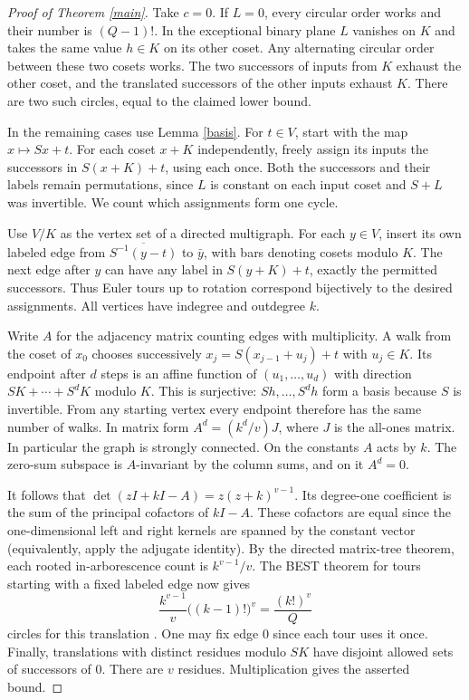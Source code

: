 \documentclass[11pt]{article}
\begin{document}
\begin{proof}[Proof of Theorem \ref{main}]
Take $c=0$. If $L=0$, every circular order works and their number is $(Q-1)!$. In the exceptional binary plane $L$ vanishes on $K$ and takes the same value $h\in K$ on its other coset. Any alternating circular order between these two cosets works. The two successors of inputs from $K$ exhaust the other coset, and the translated successors of the other inputs exhaust $K$. There are two such circles, equal to the claimed lower bound.

In the remaining cases use Lemma \ref{basis}. For $t\in V$, start with the map $x\mapsto Sx+t$. For each coset $x+K$ independently, freely assign its inputs the successors in $S(x+K)+t$, using each once. Both the successors and their labels remain permutations, since $L$ is constant on each input coset and $S+L$ was invertible. We count which assignments form one cycle.

Use $V/K$ as the vertex set of a directed multigraph. For each $y\in V$, insert its own labeled edge from $\overline{S^{-1}(y-t)}$ to $\bar y$, with bars denoting cosets modulo $K$. The next edge after $y$ can have any label in $S(y+K)+t$, exactly the permitted successors. Thus Euler tours up to rotation correspond bijectively to the desired assignments. All vertices have indegree and outdegree $k$.

Write $A$ for the adjacency matrix counting edges with multiplicity. A walk from the coset of $x_0$ chooses successively $x_j=S(x_{j-1}+u_j)+t$ with $u_j\in K$. Its endpoint after $d$ steps is an affine function of $(u_1,\ldots,u_d)$ with direction $SK+\cdots+S^dK$ modulo $K$. This is surjective: $Sh,\ldots,S^dh$ form a basis because $S$ is invertible. From any starting vertex every endpoint therefore has the same number of walks. In matrix form $A^d=(k^d/v)J$, where $J$ is the all-ones matrix. In particular the graph is strongly connected. On the constants $A$ acts by $k$. The zero-sum subspace is $A$-invariant by the column sums, and on it $A^d=0$.

It follows that $\det(zI+kI-A)=z(z+k)^{v-1}$. Its degree-one coefficient is the sum of the principal cofactors of $kI-A$. These cofactors are equal since the one-dimensional left and right kernels are spanned by the constant vector (equivalently, apply the adjugate identity). By the directed matrix-tree theorem, each rooted in-arborescence count is $k^{v-1}/v$. The BEST theorem for tours starting with a fixed labeled edge now gives
\[
 \frac{k^{v-1}}v\big((k-1)!\big)^v=\frac{(k!)^v}{Q}
\]
circles for this translation \cite{best}. One may fix edge $0$ since each tour uses it once. Finally, translations with distinct residues modulo $SK$ have disjoint allowed sets of successors of $0$. There are $v$ residues. Multiplication gives the asserted bound.\end{proof}
\end{document}
